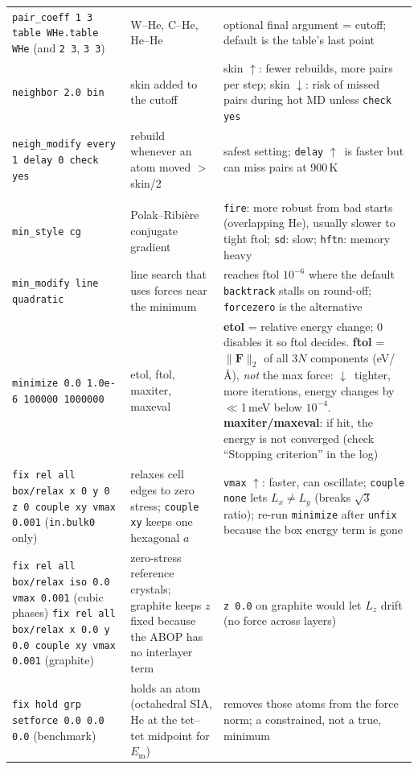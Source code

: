\documentclass[10pt]{article}
\newcommand{\cmd}[1]{\texttt{\small #1}}
\newcommand{\up}{\textcolor{org}{$\uparrow$}}
\newcommand{\dn}{\textcolor{acc}{$\downarrow$}}
\begin{document}
\begin{xltabular}{\linewidth}{L{5.0cm} L{6.1cm} Y}
\cmd{pair\_coeff 1 3 table WHe.table WHe} (and \cmd{2 3}, \cmd{3 3}) & W--He, C--He, He--He & optional final argument = cutoff; default is the table's last point \\
\cmd{neighbor 2.0 bin} & skin added to the cutoff & skin \up: fewer rebuilds, more pairs per step; skin \dn: risk of missed pairs during hot MD unless \cmd{check yes} \\
\cmd{neigh\_modify every 1 delay 0 check yes} & rebuild whenever an atom moved $>$ skin/2 & safest setting; \cmd{delay} \up\ is faster but can miss pairs at 900\,K \\
 \\
\cmd{min\_style cg} & Polak--Ribière conjugate gradient & \cmd{fire}: more robust from bad starts (overlapping He), usually slower to tight ftol; \cmd{sd}: slow; \cmd{hftn}: memory heavy \\
\cmd{min\_modify line quadratic} & line search that uses forces near the minimum & reaches ftol $10^{-6}$ where the default \cmd{backtrack} stalls on round-off; \cmd{forcezero} is the alternative \\
\cmd{minimize 0.0 1.0e-6 100000 1000000} & etol, ftol, maxiter, maxeval & \textbf{etol} = relative energy change; 0 disables it so ftol decides. \textbf{ftol} = $\|\mathbf F\|_2$ of all $3N$ components (eV/\AA), \emph{not} the max force: \dn\ tighter, more iterations, energy changes by $\ll$1\,meV below $10^{-4}$. \textbf{maxiter/maxeval}: if hit, the energy is not converged (check ``Stopping criterion'' in the log) \\
\cmd{fix rel all box/relax x 0 y 0 z 0 couple xy vmax 0.001} (\cmd{in.bulk0} only) & relaxes cell edges to zero stress; \cmd{couple xy} keeps one hexagonal $a$ & \cmd{vmax} \up: faster, can oscillate; \cmd{couple none} lets $L_x\ne L_y$ (breaks $\sqrt3$ ratio); re-run \cmd{minimize} after \cmd{unfix} because the box energy term is gone \\
\cmd{fix rel all box/relax iso 0.0 vmax 0.001} (cubic phases) \newline \cmd{fix rel all box/relax x 0.0 y 0.0 couple xy vmax 0.001} (graphite) & zero-stress reference crystals; graphite keeps $z$ fixed because the ABOP has no interlayer term & \cmd{z 0.0} on graphite would let $L_z$ drift (no force across layers) \\
\cmd{fix hold grp setforce 0.0 0.0 0.0} (benchmark) & holds an atom (octahedral SIA, He at the tet--tet midpoint for $E_\mathrm{m}$) & removes those atoms from the force norm; a constrained, not a true, minimum \\

\end{xltabular}
\end{document}
